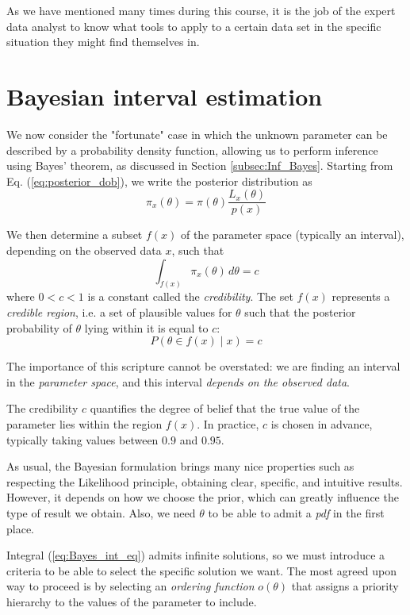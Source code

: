 As we have mentioned many times during this course, it is the job of the expert data analyst to know what tools to apply to a certain data set in the specific situation they might find themselves in. 

\section{Bayesian interval estimation}
We now consider the "fortunate" case in which the unknown parameter can be described by a probability density function, allowing us to perform inference using Bayes' theorem, as discussed in Section \ref{subsec:Inf_Bayes}. Starting from Eq. (\ref{eq:posterior_dob}), we write the posterior distribution as
\[
\pi_x(\theta) = \pi(\theta)\frac{L_x(\theta)}{p(x)}
\]

We then determine a subset $f(x)$ of the parameter space (typically an interval), depending on the observed data $x$, such that
\begin{equation}
	\int_{f(x)} \pi_x(\theta)\, d\theta = c
	\label{eq:Bayes_int_eq}
\end{equation}
where $0 < c < 1$ is a constant called the \emph{credibility}. The set $f(x)$ represents a \emph{credible region}, i.e. a set of plausible values for $\theta$ such that the posterior probability of $\theta$ lying within it is equal to $c$:
\[
P(\theta \in f(x)\mid x) = c
\]

The importance of this scripture cannot be overstated: we are finding an interval in the \emph{parameter space}, and this interval \emph{depends on the observed data}.

The credibility $c$ quantifies the degree of belief that the true value of the parameter lies within the region $f(x)$. In practice, $c$ is chosen in advance, typically taking values between $0.9$ and $0.95$.

As usual, the Bayesian formulation brings many nice properties such as respecting the Likelihood principle, obtaining clear, specific, and intuitive results. However, it depends on how we choose the prior, which can greatly influence the type of result we obtain. Also, we need $\theta$ to be able to admit a \emph{pdf} in the first place. 

Integral (\ref{eq:Bayes_int_eq}) admits infinite solutions, so we must introduce a criteria to be able to select the specific solution we want. The most agreed upon way to proceed is by selecting an \emph{ordering function} $o(\theta)$ that assigns a priority hierarchy to the values of the parameter to include. 

